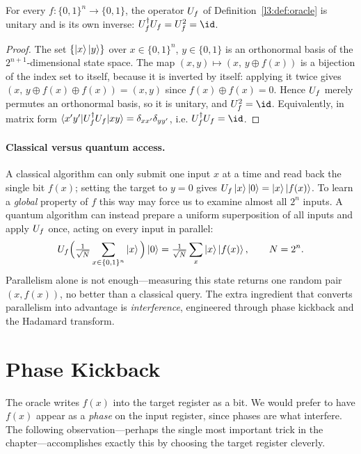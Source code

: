 \begin{lemma}
\label{l3:lem:unitary}
For every $f:\{0,1\}^n\to\{0,1\}$, the operator $U_f$ of Definition~\ref{l3:def:oracle}
is unitary and is its own inverse: $\Uf^{\dagger}\Uf=\Uf^2=\id$.
\end{lemma}

\begin{proof}
The set $\{\ket{x}\ket{y}\}$ over $x\in\{0,1\}^n$, $y\in\{0,1\}$ is an orthonormal
basis of the $2^{n+1}$-dimensional state space. The map
$(x,y)\mapsto(x,\,y\oplus f(x))$ is a bijection of the index set to itself, because
it is inverted by itself: applying it twice gives
$(x,\,y\oplus f(x)\oplus f(x))=(x,y)$ since $f(x)\oplus f(x)=0$. Hence $U_f$ merely
permutes an orthonormal basis, so it is unitary, and $\Uf^2=\id$. Equivalently, in
matrix form $\braket{x'y'|U_f^{\dagger}U_f|xy}=\delta_{xx'}\delta_{yy'}$, i.e.
$\Uf^{\dagger}\Uf=\id$.
\end{proof}

\paragraph{Classical versus quantum access.}
A classical algorithm can only submit one input $x$ at a time and read back the
single bit $f(x)$; setting the target to $y=0$ gives $U_f\ket{x}\ket{0}=\ket{x}\ket{f(x)}$.
To learn a \emph{global} property of $f$ this way may force us to examine almost
all $2^n$ inputs. A quantum algorithm can instead prepare a uniform superposition
of all inputs and apply $U_f$ once, acting on every input in parallel:
\[
  U_f\Big(\tfrac{1}{\sqrt{N}}\sum_{x\in\{0,1\}^n}\ket{x}\Big)\ket{0}
  =\tfrac{1}{\sqrt{N}}\sum_{x}\ket{x}\ket{f(x)},
  \qquad N=2^n.
\]
Parallelism alone is not enough---measuring this state returns one random pair
$(x,f(x))$, no better than a classical query. The extra ingredient that converts
parallelism into advantage is \emph{interference}, engineered through phase
kickback and the Hadamard transform.

\section{Phase Kickback}

The oracle writes $f(x)$ into the target register as a bit. We would prefer to
have $f(x)$ appear as a \emph{phase} on the input register, since phases are what
interfere. The following observation---perhaps the single most important trick in
the chapter---accomplishes exactly this by choosing the target register cleverly.

